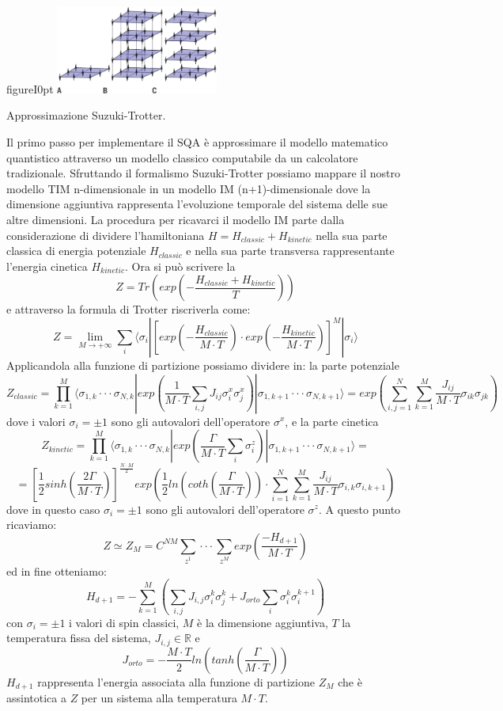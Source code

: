 \begin{wrapfloat}{figure}{I}{0pt}
\includegraphics[width=0.4\textwidth]{Immagini/suzuki.jpg}
\caption{Approssimazione Suzuki-Trotter.}
\label{figura:suzuki}
\end{wrapfloat}
\cite{QA, PIMC, CODE}Il primo passo per implementare il SQA è approssimare il modello matematico quantistico attraverso un modello classico computabile da un calcolatore tradizionale. Sfruttando il formalismo Suzuki-Trotter possiamo mappare il nostro modello TIM n-dimensionale in un modello IM (n+1)-dimensionale dove la dimensione aggiuntiva rappresenta l'evoluzione temporale del sistema delle sue altre dimensioni. La procedura per ricavarci il modello IM parte dalla considerazione di dividere l'hamiltoniana $H = H_{classic} + H_{kinetic}$ nella sua parte classica di energia potenziale $H_{classic}$ e nella sua parte transversa rappresentante l'energia cinetica $H_{kinetic}$. Ora si può scrivere la 
$$Z = Tr (exp(-\frac{H_{classic} + H_{kinetic}}{T}))$$ e attraverso la formula di Trotter riscriverla come:
$$Z= \lim_{M \to +\infty} \sum_i \langle\sigma_i|[exp(-\frac{H_{classic}}{M \cdot T}) \cdot exp(-\frac{H_{kinetic}}{M \cdot T})]^M| \sigma_i\rangle$$
Applicandola alla funzione di partizione possiamo dividere in: la parte potenziale
$$Z_{classic} = \prod^M_{k = 1}\langle\sigma_{1,k}\cdot\cdot\cdot\sigma_{N,k}|exp(\frac{1}{M \cdot T} \sum_{i,j} J_{ij}\sigma^x_i\sigma^x_j)|\sigma_{1,k+1}\cdot\cdot\cdot\sigma_{N,k+1}\rangle = exp(\sum_{i,j=1}^N\sum_{k=1}^M \frac{J_{ij}}{M \cdot T}\sigma_{ik}\sigma_{jk})$$
dove i valori $\sigma_i = \pm 1$ sono gli autovalori dell'operatore $\sigma^x$, e la parte cinetica
$$Z_{kinetic} = \prod^M_{k = 1}\langle\sigma_{1,k}\cdot\cdot\cdot\sigma_{N,k}|exp(\frac{\Gamma}{M \cdot T} \sum_{i}\sigma^z_i)|\sigma_{1,k+1}\cdot\cdot\cdot\sigma_{N,k+1}\rangle =$$
$$= [\frac{1}{2} sinh ( \frac{2\Gamma}{M \cdot T} )]^{\frac{N \cdot M}{2}} exp( \frac{1}{2} ln(coth(\frac{\Gamma}{M \cdot T}))\cdot\sum_{i=1}^N\sum_{k=1}^M \frac{J_{ij}}{M \cdot T}\sigma_{i,k}\sigma_{i,k+1})$$
dove in questo caso $\sigma_i = \pm 1$ sono gli autovalori dell'operatore $\sigma^z$.
A questo punto ricaviamo:
$$ Z \simeq Z_M = C^{NM} \sum_{z^1}\cdot\cdot\cdot\sum_{z^M} exp(\frac{-H_{d+1}}{M\cdot T})$$
ed in fine otteniamo:
$$H_{d+1} = - \sum^M_{k = 1}(\sum_{i,j} J_{i,j} \sigma^k_i \sigma^k_j + J_{orto} \sum_i \sigma^k_i \sigma^{k+1}_i)$$
con  $\sigma_i = \pm 1$ i valori di spin classici, $M$ è la dimensione aggiuntiva, $T$ la temperatura fissa del sistema, $J_{i,j} \in \mathbb{R}$ e
$$J_{orto} = - \frac{M\cdot T}{2} ln(tanh(\frac{\Gamma}{M \cdot T}))$$
$H_{d+1}$ rappresenta l'energia associata alla funzione di partizione $Z_M$ che è assintotica a $Z$ per un sistema alla temperatura $M \cdot T$.

